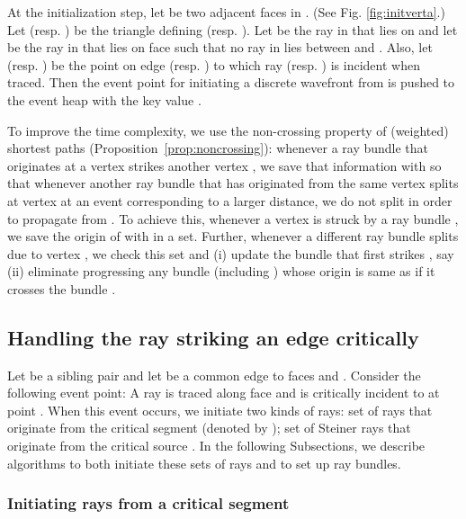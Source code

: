\documentclass[11pt]{article}
\begin{document}
At the initialization step, let  be two adjacent faces in .
(See Fig. \ref{fig:initverta}.)
Let  (resp. ) be the triangle defining  (resp. ).
Let  be the ray in  that lies on  and let  be the ray in  that lies on face  such that no ray in  lies between  and .
Also, let  (resp. ) be the point on edge  (resp. ) to which ray  (resp. ) is incident when traced.
Then the event point for initiating a discrete wavefront from  is pushed to the event heap with the key value .

To improve the time complexity, we use the non-crossing property of (weighted) shortest paths (Proposition~\ref{prop:noncrossing}): whenever a ray bundle  that originates at a vertex  strikes another vertex , we save that information with  so that whenever another ray bundle  that has originated from the same vertex  splits at vertex  at an event corresponding to a larger distance, we do not split  in order to propagate from .
To achieve this, whenever a vertex  is struck by a ray bundle , we save the origin of  with  in a set.
Further, whenever a different ray bundle  splits due to vertex , we check this set and (i) update the bundle that first strikes , say  (ii) eliminate progressing any bundle (including ) whose origin is same as  if it crosses the bundle .

\subsection{Handling the ray striking an edge critically}
\label{subsect:crit}

Let  be a sibling pair and let  be a common edge to faces  and .
Consider the following event point: A ray  is traced along face  and is critically incident to  at point .
When this event occurs, we initiate two kinds of rays:
set  of rays that originate from the critical segment  (denoted by );
set  of Steiner rays that originate from the critical source . 
In the following Subsections, we describe algorithms to both initiate these sets of rays and to set up ray bundles. 

\subsubsection{Initiating rays from a critical segment}
\label{subsect:initrayscritseg}
\end{document}
